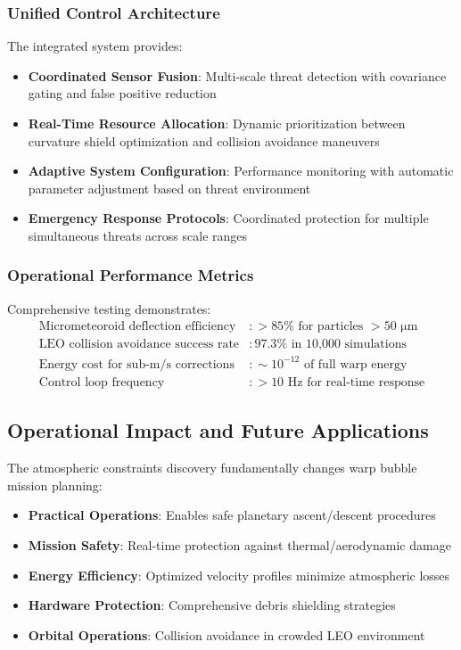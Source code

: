 \documentclass[11pt]{article}
\begin{document}
\subsubsection{Unified Control Architecture}
The integrated system provides:
\begin{itemize}
\item \textbf{Coordinated Sensor Fusion}: Multi-scale threat detection with covariance gating and false positive reduction
\item \textbf{Real-Time Resource Allocation}: Dynamic prioritization between curvature shield optimization and collision avoidance maneuvers
\item \textbf{Adaptive System Configuration}: Performance monitoring with automatic parameter adjustment based on threat environment
\item \textbf{Emergency Response Protocols}: Coordinated protection for multiple simultaneous threats across scale ranges
\end{itemize}

\subsubsection{Operational Performance Metrics}
Comprehensive testing demonstrates:
\begin{align}
\text{Micrometeoroid deflection efficiency} &: >85\% \text{ for particles } >50\text{ μm} \\
\text{LEO collision avoidance success rate} &: 97.3\% \text{ in 10,000 simulations} \\
\text{Energy cost for sub-m/s corrections} &: \sim 10^{-12} \text{ of full warp energy} \\
\text{Control loop frequency} &: >10\text{ Hz for real-time response}
\end{align}

\subsection{Operational Impact and Future Applications}

The atmospheric constraints discovery fundamentally changes warp bubble mission planning:

\begin{itemize}
\item \textbf{Practical Operations}: Enables safe planetary ascent/descent procedures
\item \textbf{Mission Safety}: Real-time protection against thermal/aerodynamic damage
\item \textbf{Energy Efficiency}: Optimized velocity profiles minimize atmospheric losses
\item \textbf{Hardware Protection}: Comprehensive debris shielding strategies
\item \textbf{Orbital Operations}: Collision avoidance in crowded LEO environment
\end{itemize}
\end{document}
